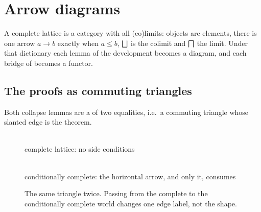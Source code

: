 \section{Arrow diagrams}

A complete lattice is a category with all (co)limits: objects are elements, there is one
arrow $a \to b$ exactly when $a \le b$, $\bigsqcup$ is the colimit and $\Inf$ the limit.  Under
that dictionary each lemma of the development becomes a diagram, and each bridge of
 becomes a functor.

\subsection{The proofs as commuting triangles}

Both collapse lemmas are a  of two equalities, i.e.\ a commuting triangle
whose slanted edge is the theorem.

\begin{figure}[ht]
\centering
\begin{minipage}{.48\textwidth}\centering
\begin{cdscale}{\textwidth}
\end{cdscale}
\\[4pt]{\footnotesize complete lattice: no side conditions}
\end{minipage}\hfill
\begin{minipage}{.48\textwidth}\centering
\begin{cdscale}{\textwidth}
\end{cdscale}
\\[4pt]{\footnotesize conditionally complete: the horizontal arrow, and only it, consumes
}
\end{minipage}
\caption{The same triangle twice.  Passing from the complete to the conditionally
complete world changes one edge label, not the shape.}
\end{figure}

